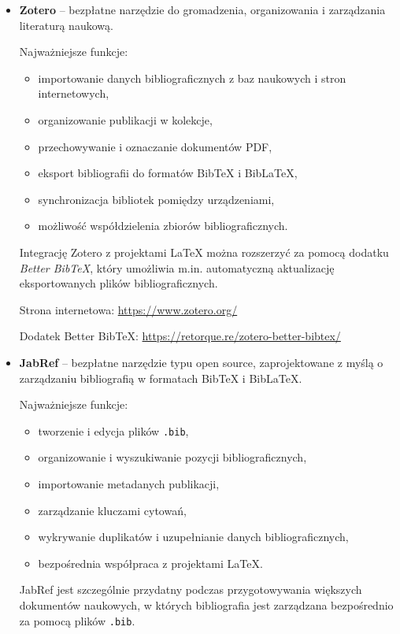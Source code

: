 \begin{itemize}

    \item \textbf{Zotero} -- bezpłatne narzędzie do gromadzenia, organizowania i zarządzania literaturą naukową.

    Najważniejsze funkcje:
    \begin{itemize}
        \item importowanie danych bibliograficznych z baz naukowych i stron internetowych,
        \item organizowanie publikacji w kolekcje,
        \item przechowywanie i oznaczanie dokumentów PDF,
        \item eksport bibliografii do formatów BibTeX i BibLaTeX,
        \item synchronizacja bibliotek pomiędzy urządzeniami,
        \item możliwość współdzielenia zbiorów bibliograficznych.
    \end{itemize}

    Integrację Zotero z projektami \LaTeX{} można rozszerzyć za pomocą dodatku \textit{Better BibTeX}, który umożliwia m.in. automatyczną aktualizację eksportowanych plików bibliograficznych.

    Strona internetowa: \url{https://www.zotero.org/}

    Dodatek Better BibTeX:
    \url{https://retorque.re/zotero-better-bibtex/}

    \item \textbf{JabRef} -- bezpłatne narzędzie typu open source, zaprojektowane z myślą o zarządzaniu bibliografią w formatach BibTeX i BibLaTeX.

    Najważniejsze funkcje:
    \begin{itemize}
        \item tworzenie i edycja plików \texttt{.bib},
        \item organizowanie i wyszukiwanie pozycji bibliograficznych,
        \item importowanie metadanych publikacji,
        \item zarządzanie kluczami cytowań,
        \item wykrywanie duplikatów i uzupełnianie danych bibliograficznych,
        \item bezpośrednia współpraca z projektami \LaTeX{}.
    \end{itemize}

    JabRef jest szczególnie przydatny podczas przygotowywania większych dokumentów naukowych, w których bibliografia jest zarządzana bezpośrednio za pomocą plików \texttt{.bib}.


\end{itemize}
